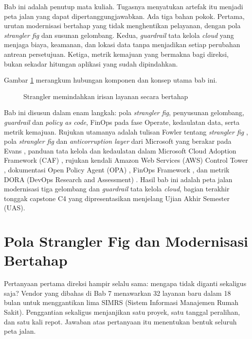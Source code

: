 Bab ini adalah penutup mata kuliah. Tugasnya menyatukan artefak itu menjadi peta jalan yang dapat
dipertanggungjawabkan. Ada tiga bahan pokok. Pertama, urutan modernisasi bertahap yang tidak
menghentikan pelayanan, dengan pola \textit{strangler fig} dan susunan gelombang. Kedua,
\textit{guardrail} tata kelola \textit{cloud} yang menjaga biaya, keamanan, dan lokasi data tanpa
menjadikan setiap perubahan antrean persetujuan. Ketiga, metrik kemajuan yang bermakna bagi direksi,
bukan sekadar hitungan aplikasi yang sudah dipindahkan.

Gambar \ref{fig:ch14-peta-jalan} merangkum hubungan komponen dan konsep utama bab ini.
\begin{figure}[!htb]
  \centering
  
  \caption{Strangler memindahkan irisan layanan secara bertahap}
  \label{fig:ch14-peta-jalan}
\end{figure}

Bab ini disusun dalam enam langkah: pola \textit{strangler fig}, penyusunan gelombang,
\textit{guardrail} dan \textit{policy as code}, FinOps pada fase Operate, kedaulatan data, serta
metrik kemajuan. Rujukan utamanya adalah tulisan Fowler tentang \textit{strangler fig}
\cite{c14-fowler-strangler}, pola \textit{strangler fig} dan \textit{anticorruption layer} dari
Microsoft \cite{c14-azure-strangler,c14-azure-acl} yang berakar pada Evans \cite{evans2003},
panduan tata kelola dan kedaulatan dalam Microsoft Cloud Adoption Framework (CAF)
\cite{azurecaf,c14-azure-govern,c14-azure-sovereignty}, rujukan kendali Amazon Web Services (AWS)
Control Tower \cite{c14-aws-controls}, dokumentasi Open Policy Agent (OPA) \cite{c14-opa}, FinOps Framework
\cite{finops2026}, dan metrik DORA (DevOps Research and Assessment) \cite{dora-metrics}. Hasil
bab ini adalah peta jalan modernisasi tiga gelombang dan \textit{guardrail} tata kelola
\textit{cloud}, bagian terakhir tonggak capstone C4 yang dipresentasikan menjelang Ujian Akhir
Semester (UAS).

\section{Pola Strangler Fig dan Modernisasi Bertahap}
\label{sec:ch14-strangler}

Pertanyaan pertama direksi hampir selalu sama: mengapa tidak diganti sekaligus saja? Vendor yang
dibahas di Bab 7 menawarkan 32 layanan baru dalam 18 bulan untuk menggantikan lima SIMRS (Sistem
Informasi Manajemen Rumah Sakit). Penggantian sekaligus menjanjikan satu proyek, satu tanggal
peralihan, dan satu kali repot. Jawaban atas pertanyaan itu menentukan bentuk seluruh peta jalan.

